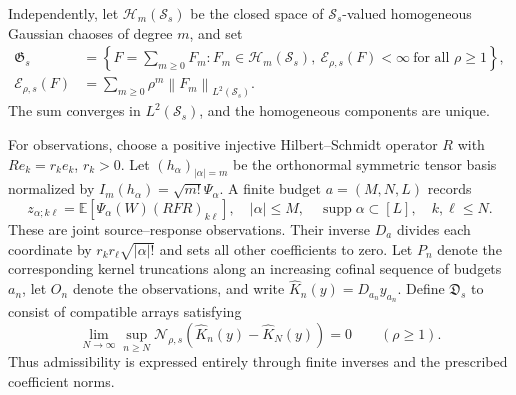 \documentclass[11pt,a4paper]{amsart}
\numberwithin{equation}{section}
\theoremstyle{definition}
\theoremstyle{remark}
\newcommand{\E}{\mathbb E}
\newcommand{\Sch}{\mathcal S}
\newcommand{\Data}{\mathfrak D}
\newcommand{\Gaus}{\mathfrak G}
\newcommand{\norm}[1]{\left\lVert#1\right\rVert}
\newcommand{\Nn}[2]{\mathcal N_{#1,s}(#2)}
\newcommand{\En}[2]{\mathcal E_{#1,s}(#2)}
\begin{document}
Independently, let $\mathcal H_m(\Sch_s)$ be the closed space of $\Sch_s$-valued homogeneous Gaussian chaoses of degree $m$, and set
\begin{equation}\label{eq:intro-random}
 \begin{aligned}
 \Gaus_s&=\left\{F=\sum_{m\ge0}F_m:F_m\in\mathcal H_m(\Sch_s),\
                      \En\rho F<\infty\ \text{for all }\rho\ge1\right\},\\
 \En\rho F&=\sum_{m\ge0}\rho^m\norm{F_m}_{L^2(\Sch_s)}.
 \end{aligned}
\end{equation}
The sum converges in $L^2(\Sch_s)$, and the homogeneous components are unique.

For observations, choose a positive injective Hilbert--Schmidt operator $R$ with $Re_k=r_ke_k$, $r_k>0$. Let $(h_\alpha)_{|\alpha|=m}$ be the orthonormal symmetric tensor basis normalized by $I_m(h_\alpha)=\sqrt{m!}\Psi_\alpha$. A finite budget $a=(M,N,L)$ records
\begin{equation}\label{eq:intro-marks}
 z_{\alpha;k\ell}=\E[\Psi_\alpha(W)(RFR)_{k\ell}],
 \quad |\alpha|\le M,\quad\operatorname{supp}\alpha\subset[L],\quad k,\ell\le N.
\end{equation}
These are joint source--response observations. Their inverse $D_a$ divides each coordinate by $r_kr_\ell\sqrt{|\alpha|!}$ and sets all other coefficients to zero. Let $P_n$ denote the corresponding kernel truncations along an increasing cofinal sequence of budgets $a_n$, let $O_n$ denote the observations, and write $\widehat K_n(y)=D_{a_n}y_{a_n}$. Define $\Data_s$ to consist of compatible arrays satisfying
\begin{equation}\label{eq:intro-admissible}
 \lim_{N\to\infty}\sup_{n\ge N}
 \Nn\rho{\widehat K_n(y)-\widehat K_N(y)}=0
 \qquad(\rho\ge1).
\end{equation}
Thus admissibility is expressed entirely through finite inverses and the prescribed coefficient norms.
\end{document}
